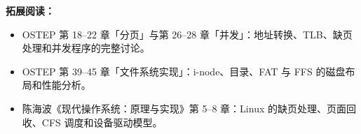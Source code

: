 \begin{samepage}
\noindent\textbf{拓展阅读：}
\begin{itemize}
  \item OSTEP 第 18--22 章「分页」与第 26--28 章「并发」：地址转换、TLB、缺页处理和并发程序的完整讨论。
  \item OSTEP 第 39--45 章「文件系统实现」：i-node、目录、FAT 与 FFS 的磁盘布局和性能分析。
  \item 陈海波《现代操作系统：原理与实现》第 5--8 章：Linux 的缺页处理、页面回收、CFS 调度和设备驱动模型。
\end{itemize}
\end{samepage}


